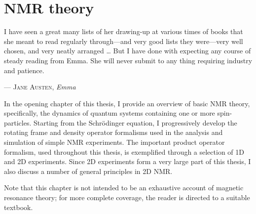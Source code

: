 \chapter{NMR theory}
\label{chpt:theory}

\epigraph{\singlespacing%
I have seen a great many lists of her drawing-up at various times of books that she meant to read regularly through—and very good lists they were---very well chosen, and very neatly arranged \ldots{} But I have done with expecting any course of steady reading from Emma. She will never submit to any thing requiring industry and patience.
}{--- \textsc{Jane Austen}, \textit{Emma}}

In the opening chapter of this thesis, I provide an overview of basic NMR theory, specifically, the dynamics of quantum systems containing one or more spin-\half{} particles.
Starting from the Schr\"odinger equation, I progressively develop the rotating frame and density operator formalisms used in the analysis and simulation of simple NMR experiments.
The important product operator formalism, used throughout this thesis, is exemplified through a selection of 1D and 2D experiments.
Since 2D experiments form a very large part of this thesis, I also discuss a number of general principles in 2D NMR.

Note that this chapter is not intended to be an exhaustive account of magnetic resonance theory; for more complete coverage, the reader is directed to a suitable textbook.

\clearpage






\printbibliography[heading=subbibnumbered]{}
